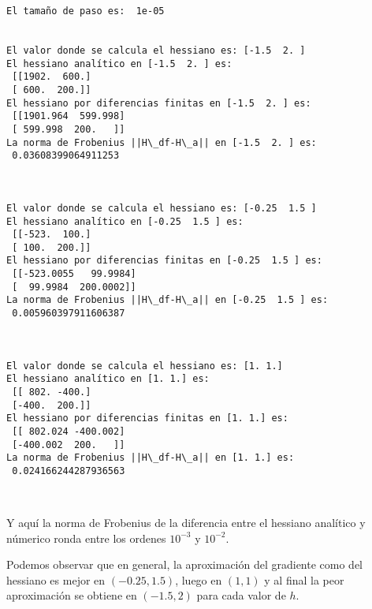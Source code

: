 \documentclass[11pt]{article}
\begin{document}
    \begin{Verbatim}[commandchars=\\\{\}]
El tamaño de paso es:  1e-05


El valor donde se calcula el hessiano es: [-1.5  2. ]
El hessiano analítico en [-1.5  2. ] es:
 [[1902.  600.]
 [ 600.  200.]]
El hessiano por diferencias finitas en [-1.5  2. ] es:
 [[1901.964  599.998]
 [ 599.998  200.   ]]
La norma de Frobenius ||H\_df-H\_a|| en [-1.5  2. ] es:
 0.03608399064911253



El valor donde se calcula el hessiano es: [-0.25  1.5 ]
El hessiano analítico en [-0.25  1.5 ] es:
 [[-523.  100.]
 [ 100.  200.]]
El hessiano por diferencias finitas en [-0.25  1.5 ] es:
 [[-523.0055   99.9984]
 [  99.9984  200.0002]]
La norma de Frobenius ||H\_df-H\_a|| en [-0.25  1.5 ] es:
 0.005960397911606387



El valor donde se calcula el hessiano es: [1. 1.]
El hessiano analítico en [1. 1.] es:
 [[ 802. -400.]
 [-400.  200.]]
El hessiano por diferencias finitas en [1. 1.] es:
 [[ 802.024 -400.002]
 [-400.002  200.   ]]
La norma de Frobenius ||H\_df-H\_a|| en [1. 1.] es:
 0.024166244287936563



    \end{Verbatim}

    Y aquí la norma de Frobenius de la diferencia entre el hessiano
analítico y númerico ronda entre los ordenes \(10^{-3}\) y \(10^{-2}\).

Podemos observar que en general, la aproximación del gradiente como del
hessiano es mejor en \((-0.25,1.5)\), luego en \((1,1)\) y al final la
peor aproximación se obtiene en \((-1.5,2)\) para cada valor de \(h\).


    
    
    
\end{document}
